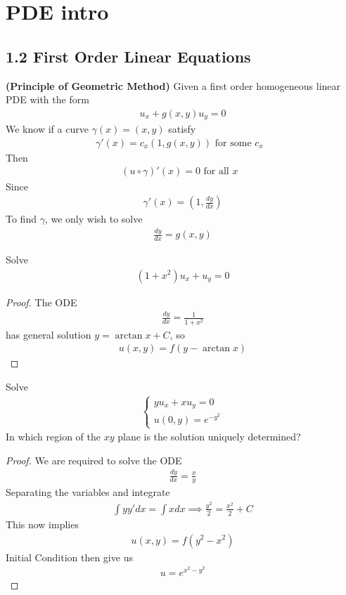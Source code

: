 \documentclass{report}
\begin{document}
\chapter{PDE intro}
\section{1.2 First Order Linear Equations}
\begin{mdframed}
\textbf{(Principle of Geometric Method)} Given a first order homogeneous linear PDE with the form  
\begin{align*}
u_x+g(x,y)u_y=0
\end{align*}
We know if a curve $\gamma (x)= (x,y)$ satisfy 
\begin{align*}
\gamma '(x)= c_x(1,g(x,y))\text{ for some $c_x$ }
\end{align*} 
Then 
\begin{align*}
  (u\circ \gamma )'(x)=0\text{ for all $x$ }
\end{align*}
Since 
\begin{align*}
\gamma '(x)=(1, \frac{dy}{dx})
\end{align*}
To find $\gamma $, we only wish to solve 
\begin{align*}
\frac{dy}{dx}=g(x,y)
\end{align*}
\end{mdframed}
\begin{question}{}{}
Solve 
\begin{align*}
  (1+x^2)u_x+u_y=0
\end{align*}
\end{question}
\begin{proof}
The ODE 
\begin{align*}
\frac{dy}{dx}=\frac{1}{1+x^2}
\end{align*}
has general solution $y=\arctan x + C$, so 
\begin{align*}
u(x,y)=f(y-\arctan x)
\end{align*}
\end{proof}
\begin{question}{}{}
Solve 
\begin{align*}
\begin{cases}
  yu_x+xu_y=0\\
  u(0,y)=e^{-y^2}
\end{cases}
\end{align*}
In which region of the $xy$ plane is the solution uniquely determined? 
\end{question}
\begin{proof}
We are required to solve the ODE 
\begin{align*}
\frac{dy}{dx}= \frac{x}{y}
\end{align*}
Separating the variables and integrate 
\begin{align*}
\int yy' dx= \int xdx  \implies \frac{y^2}{2}= \frac{x^2}{2}+C
\end{align*}
This now implies 
\begin{align*}
u(x,y)=f(y^2-x^2)
\end{align*}
Initial Condition then give us 
\begin{align*}
u=e^{x^2-y^2}
\end{align*}

\end{proof}
\end{document}
